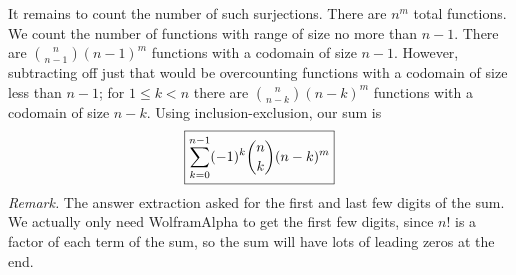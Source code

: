 \begin{solution}
    It remains to count the number of such surjections.
    There are $n^m$ total functions. We count the number of functions with range of size no more than 
    $n - 1$. There are $\binom{n}{n - 1}(n - 1)^m$ functions with a codomain of size $n - 1$. 
    However, subtracting off just that would be overcounting functions with a codomain of size 
    less than $n - 1$; for $1 \leq k < n$ there are $\binom{n}{n - k}(n - k)^m$ functions with 
    a codomain of size $n - k$. Using inclusion-exclusion, our sum is 
    $$\boxed{\sum_{k = 0}^{n - 1} (-1)^k\dbinom{n}{k}(n - k)^m}$$ 
    \textit{Remark.} The answer extraction asked for the first and last few digits of the sum. 
    We actually only need WolframAlpha to get the first few digits, since $n!$ is a factor of 
    each term of the sum, so the sum will have lots of leading zeros at the end. 
\end{solution}\bigskip

